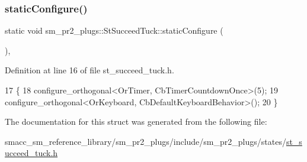 \subsubsection{\texorpdfstring{static\+Configure()}{staticConfigure()}}
{\footnotesize\ttfamily static void sm\+\_\+pr2\+\_\+plugs\+::\+St\+Succeed\+Tuck\+::static\+Configure (\begin{DoxyParamCaption}{ }\end{DoxyParamCaption})\hspace{0.3cm}{\ttfamily [inline]}, {\ttfamily [static]}}



Definition at line 16 of file st\+\_\+succeed\+\_\+tuck.\+h.


\begin{DoxyCode}
17     \{
18         configure\_orthogonal<OrTimer,  CbTimerCountdownOnce>(5);    
19         configure\_orthogonal<OrKeyboard, CbDefaultKeyboardBehavior>();
20     \}
\end{DoxyCode}


The documentation for this struct was generated from the following file\+:\begin{DoxyCompactItemize}
\item 
smacc\+\_\+sm\+\_\+reference\+\_\+library/sm\+\_\+pr2\+\_\+plugs/include/sm\+\_\+pr2\+\_\+plugs/states/\hyperlink{st__succeed__tuck_8h}{st\+\_\+succeed\+\_\+tuck.\+h}\end{DoxyCompactItemize}
